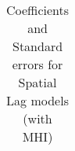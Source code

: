 \documentclass[10pt, letterpaper, landscape]{amsart}
\begin{document}

\begin{table}[!ht]
  \centering
  \caption{Coefficients and Standard errors for Spatial Lag models (with MHI)}
  \label{my-label}
  \renewcommand{\arraystretch}{0.7}
  \begin{tabular}{@{}llllllll@{}}

\end{tabular}
\end{table}
\end{document}

